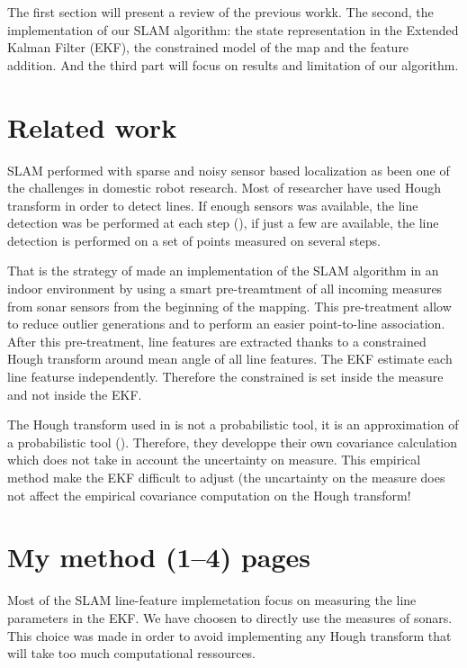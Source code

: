 \documentclass[a4paper,12pt]{article}
\begin{document}
The first section will present a review of the previous workk. The second, the implementation of our SLAM algorithm: the state representation in the Extended Kalman Filter (EKF), the constrained model of the map and the feature addition. And the third part will focus on results and limitation of our algorithm.

\section{Related work}
\label{sec:relwork}

SLAM performed with sparse and noisy sensor based localization as been one of the challenges in domestic robot research. 
Most of researcher have used Hough transform in order to detect lines. If enough sensors was available, the line detection was be performed at each step (\cite{grossmann2001robust}), if just a few are available, the line detection is performed on a set of points measured on several steps.

That is the strategy of \cite{choi2008line} made an implementation of the SLAM algorithm in an indoor environment by using a smart pre-treamtment of all incoming measures from sonar sensors from the beginning of the mapping. This pre-treatment allow to reduce outlier generations and to perform an easier point-to-line association.
After this pre-treatment, line features are extracted thanks to a constrained Hough transform around mean angle of all line features. The EKF estimate each line featurse independently.
Therefore the constrained is set inside the measure and not inside the EKF.

The Hough transform used in \cite{choi2008line} is not a probabilistic tool, it is an approximation of a probabilistic tool (\cite{stephens1991probabilistic}).
Therefore, they developpe their own covariance calculation which does not take in account the uncertainty on measure.
This empirical method make the EKF difficult to adjust (the uncartainty on the measure does not affect the empirical covariance computation on the Hough transform!



\section{My method (1--4) pages}
\label{sec:method}

Most of the SLAM line-feature implemetation focus on measuring the line parameters  in the EKF. We have choosen to directly use the measures of sonars.
This choice was made in order to avoid implementing any Hough transform that will take too much computational ressources.
\end{document}

